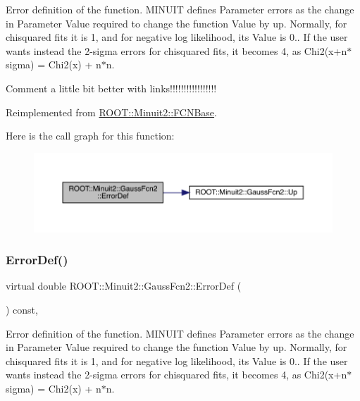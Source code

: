 Error definition of the function. M\+I\+N\+U\+IT defines Parameter errors as the change in Parameter Value required to change the function Value by up. Normally, for chisquared fits it is 1, and for negative log likelihood, its Value is 0.. If the user wants instead the 2-\/sigma errors for chisquared fits, it becomes 4, as Chi2(x+n$\ast$sigma) = Chi2(x) + n$\ast$n.

Comment a little bit better with links!!!!!!!!!!!!!!!!! 

Reimplemented from \mbox{\hyperlink{classROOT_1_1Minuit2_1_1FCNBase_ac4592475c58a65b037ba97ab5f3cba10}{R\+O\+O\+T\+::\+Minuit2\+::\+F\+C\+N\+Base}}.

Here is the call graph for this function\+:
\nopagebreak
\begin{figure}[H]
\begin{center}
\leavevmode
\includegraphics[width=350pt]{da/d5d/classROOT_1_1Minuit2_1_1GaussFcn2_ac240f7b6ecbb7bf842d786e3914c620a_cgraph}
\end{center}
\end{figure}
\mbox{\label{classROOT_1_1Minuit2_1_1GaussFcn2_ac240f7b6ecbb7bf842d786e3914c620a}} 
\subsubsection{\texorpdfstring{ErrorDef()}{ErrorDef()}\hspace{0.1cm}{\footnotesize\ttfamily [2/2]}}
{\footnotesize\ttfamily virtual double R\+O\+O\+T\+::\+Minuit2\+::\+Gauss\+Fcn2\+::\+Error\+Def (\begin{DoxyParamCaption}{ }\end{DoxyParamCaption}) const\hspace{0.3cm}{\ttfamily [inline]}, {\ttfamily [virtual]}}

Error definition of the function. M\+I\+N\+U\+IT defines Parameter errors as the change in Parameter Value required to change the function Value by up. Normally, for chisquared fits it is 1, and for negative log likelihood, its Value is 0.. If the user wants instead the 2-\/sigma errors for chisquared fits, it becomes 4, as Chi2(x+n$\ast$sigma) = Chi2(x) + n$\ast$n.

